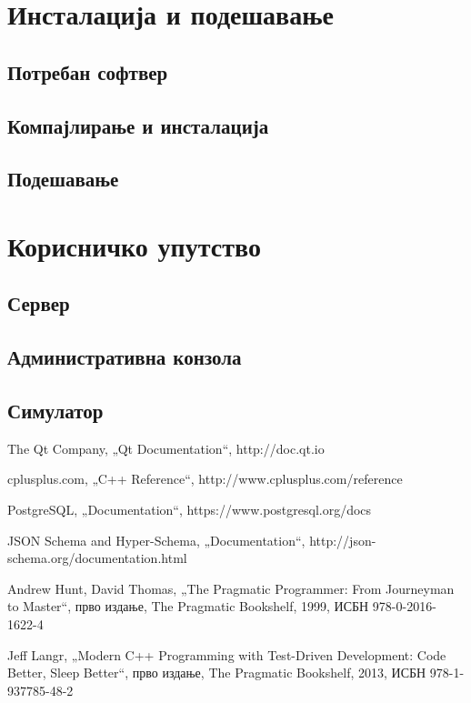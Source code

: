 \documentclass[a4paper, 12pt, diplomski]{etfcyr}
\def\quote#1{„#1“}
\begin{document}
	\chapter{Инсталација и подешавање}

		\section{Потребан софтвер}

		\section{Компајлирање и инсталација}

		\section{Подешавање}

	\chapter{Корисничко упутство}

		\section{Сервер}

		\section{Административна конзола}

		\section{Симулатор}


	\begin{thebibliography}{9}
		The Qt Company, \quote{Qt Documentation},
		http://doc.qt.io

		cplusplus.com, \quote{C++ Reference},
		http://www.cplusplus.com/reference

		PostgreSQL, \quote{Documentation},
		https://www.postgresql.org/docs

		JSON Schema and Hyper-Schema, \quote{Documentation},
		http://json-schema.org/documentation.html

		Andrew Hunt, David Thomas, \quote{The Pragmatic Programmer: From Journeyman to Master},
		прво издање, The Pragmatic Bookshelf, 1999, ИСБН 978-0-2016-1622-4
		
		Jeff Langr, \quote{Modern C++ Programming with Test-Driven Development: Code Better, Sleep Better},
		прво издање, The Pragmatic Bookshelf, 2013, ИСБН 978-1-937785-48-2
	\end{thebibliography}
\end{document}
